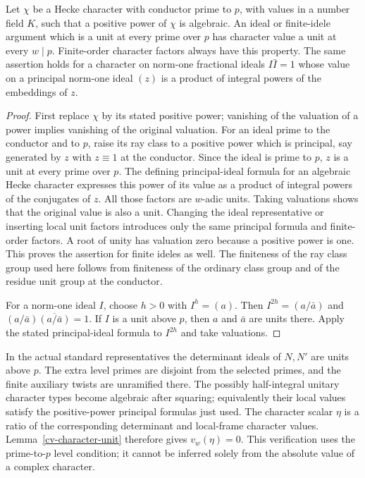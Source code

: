 \begin{lemma}\label{cv-character-unit}
Let $\chi$ be a Hecke character with conductor prime to
$p$, with values in a number field $K$, such that a positive power
of $\chi$ is algebraic.  An ideal or finite-idele
argument which is a unit at every prime over $p$ has character value
a unit at every $w\mid p$.  Finite-order character factors always
have this property.  The same assertion holds for a character on
norm-one fractional ideals $I\bar I=1$ whose value on a principal
norm-one ideal $(z)$ is a product of integral powers of the embeddings
of $z$.
\end{lemma}
\begin{proof}
First replace $\chi$ by its stated positive power; vanishing of
the valuation of a power implies vanishing of the original valuation.
For an ideal prime to the conductor and to $p$, raise its ray class
to a positive power which is principal, say generated by $z$ with
$z\equiv1$ at the conductor.  Since the ideal is prime to $p$,
$z$ is a unit at every prime over $p$.  The defining principal-ideal
formula for an algebraic Hecke character expresses this power of
its value as a product of integral powers of the conjugates of $z$.
All those factors are $w$-adic units.  Taking valuations shows that
the original value is also a unit.  Changing the ideal representative
or inserting local unit factors introduces only the same principal
formula and finite-order factors.  A root of unity has valuation
zero because a positive power is one.  This proves the assertion
for finite ideles as well.  The finiteness of the ray class group
used here follows from finiteness of the ordinary class group and
of the residue unit group at the conductor.

For a norm-one ideal $I$, choose $h>0$ with $I^h=(a)$.
Then $I^{2h}=(a/\bar a)$ and
$(a/\bar a)\overline{(a/\bar a)}=1$.  If $I$ is a unit above $p$,
then $a$ and $\bar a$ are units there.  Apply the stated
principal-ideal formula to $I^{2h}$ and take valuations.
\end{proof}

In the actual standard representatives the determinant ideals of
$N,N'$ are units above $p$.  The extra level primes are disjoint
from the selected primes, and the finite auxiliary twists are
unramified there.  The possibly half-integral unitary character types
become algebraic after squaring; equivalently their local values
satisfy the positive-power principal formulas just used.  The
character scalar $\eta$ is a ratio of the
corresponding determinant and local-frame character values.
Lemma~\ref{cv-character-unit} therefore gives $v_w(\eta)=0$.
This verification uses the prime-to-$p$ level condition; it cannot
be inferred solely from the absolute value of a complex character.

